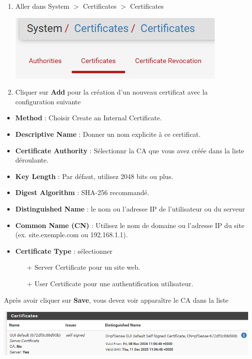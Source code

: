 \documentclass[french, 12pt]{article}%
\newcommand{\itemE}{\item[$\bullet$]}
\begin{document}
\begin{enumerate}
\item Aller dans System $>$ Certificates $>$ Certificates

\begin{center}
\includegraphics[scale=0.7]{./ressource/certificatPfsense}
\end{center}

\item Cliquer sur \textbf{Add} pour la création d'un nouveau certificat avec la configuration suivante
\end{enumerate}

\begin{itemize}
\itemE \textbf{Method} : Choisir Create an Internal Certificate.
\itemE \textbf{Descriptive Name} : Donner un nom explicite à ce certificat.
\itemE \textbf{Certificate Authority} : Sélectionnr la CA que vous avez créée dans la liste déroulante.
\itemE \textbf{Key Length} : Par défaut, utilisez 2048 bits ou plus.
\itemE \textbf{Digest Algorithm} : SHA-256 recommandé.

\itemE \textbf{Distinguished Name} : le nom ou l'adresse IP de l'utilisateur ou du serveur
\itemE \textbf{Common Name (CN)} : Utilisez le nom de domaine ou l'adresse IP du site (ex. site.exemple.com ou 192.168.1.1).
\itemE \textbf{Certificate Type} : sélectionner
	\begin{itemize}
	\item[+] Server Certificate pour un site web.
	\item[+] User Certificate pour une authentification utilisateur.
	\end{itemize}

\end{itemize}

Après avoir cliquer sur \textbf{Save}, vous devez voir apparaître le CA dans la liste

\begin{center}
\includegraphics[scale=0.7]{./ressource/certificatExemple}
\end{center}
\end{document}
